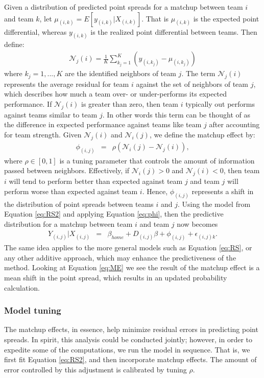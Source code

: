 \documentclass[letterpaper,12pt]{article}
\begin{document}
Given a distribution of predicted point spreads for a matchup between team $i$ and team $k$, let $\mu_{(i,k)} = E[y_{(i,k)}|X_{(i,k)}]$. That is $\mu_{(i,k)}$ is the expected point differential, whereas $y_{(i,k)}$ is the realized point differential between teams. Then define:
\begin{eqnarray*}
\mathcal{N}_j(i) = \frac{1}{K}\sum_{k_j=1}^K \left(y_{(i,k_j)} - \mu_{(i,k_j)}\right)
\end{eqnarray*}
where $k_j = 1,...,K$ are the identified neighbors of team $j$. The term $\mathcal{N}_j(i)$ represents the average residual for team $i$ against the set of neighbors of team $j$, which describes how much a team over- or under-performs its expected performance. If $\mathcal{N}_j(i)$ is greater than zero, then team $i$ typically out performs against teams similar to team $j$. In other words this term can be thought of as the difference in expected performance against teams like team $j$ after accounting for team strength. Given $\mathcal{N}_j(i)$ and $\mathcal{N}_i(j)$, we define the matchup effect by:
\begin{eqnarray}
\phi_{(i,j)} &=& \rho(\mathcal{N}_i(j) -\mathcal{N}_j(i)),\label{eq:phi}
\end{eqnarray}
where $\rho \in [0,1]$ is a tuning parameter that controls the amount of information passed between neighbors. Effectively, if $\mathcal{N}_i(j) >0$ and $\mathcal{N}_j(i)<0$, then team $i$ will tend to perform better than expected against team $j$ and team $j$ will perform worse than expected against team $i$. Hence, $\phi_{(i,j)}$ represents a shift in the distribution of point spreads between teams $i$ and $j$. Using the model from Equation \ref{eq:RS2} and applying Equation \ref{eq:phi}, then the predictive distribution for a matchup between team $i$ and team $j$ now becomes
\begin{eqnarray}
Y_{(i,j)}|X_{(i,j)} &=& \beta_{home} +  D_{(i,j)}\beta + \phi_{(i,j)} +  \epsilon_{(i,j)k} \label{eq:ME}.
\end{eqnarray}
The same idea applies to the more general models such as Equation \ref{eq:RS}, or any other additive approach, which may enhance the predictiveness of the method. Looking at Equation \ref{eq:ME} we see the result of the matchup effect is a mean shift in the point spread, which results in an updated probability calculation.

\subsubsection{Model tuning\label{sec:tuning}}
The matchup effects, in essence, help minimize residual errors in predicting point spreads. In spirit, this analysis could be conducted jointly; however, in order to expedite some of the computations, we run the model in sequence. That is, we first fit Equation \ref{eq:RS2}, and then incorporate matchup effects. The amount of error controlled by this adjustment is calibrated by tuning $\rho$. 
\end{document}
